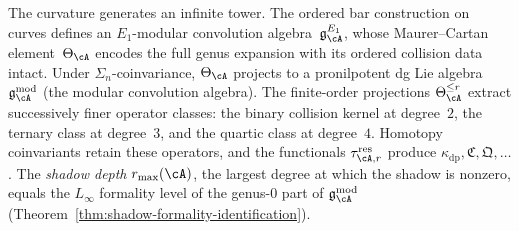 The curvature generates an infinite tower.
The ordered bar construction on curves defines an
$E_1$-modular convolution algebra~$\mathfrak{g}^{E_1}_\cA$,
whose Maurer--Cartan element~$\Theta_\cA$ encodes the full genus
expansion with its ordered collision data intact. Under
$\Sigma_n$-coinvariance, $\Theta_\cA$ projects to a pronilpotent
dg Lie algebra~$\gAmod$ (the modular convolution algebra). The
finite-order projections $\Theta_\cA^{\leq r}$ extract successively
finer operator classes: the binary collision kernel at degree~$2$,
the ternary class at degree~$3$, and the quartic class at degree~$4$.
Homotopy coinvariants retain these operators, and the functionals
$\tau_{\cA,r}^{\mathrm{res}}$ produce
$\kappa_{\mathrm{dp}},\mathfrak C,\mathfrak Q,\ldots$. The
\emph{shadow depth} $r_{\max}(\cA)$, the
largest degree at which the shadow is nonzero, equals
the $L_\infty$ formality level of the genus-$0$ part of $\gAmod$
(Theorem~\ref{thm:shadow-formality-identification}).

